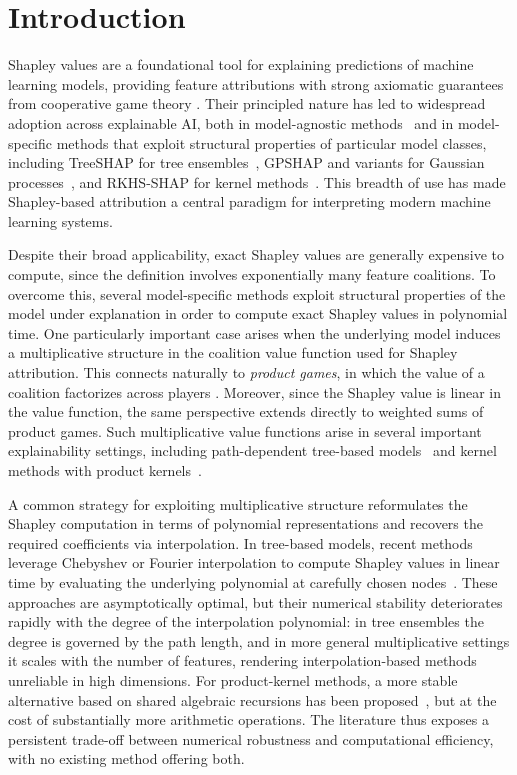 \documentclass{article}
\begin{document}
\section{Introduction}

Shapley values are a foundational tool for explaining predictions of machine learning models, providing feature attributions with strong axiomatic guarantees from cooperative game theory \citep{shapley}. Their principled nature has led to widespread adoption across explainable AI, both in model-agnostic methods~\citep{shap, shapiq, polyshap} and in model-specific methods that exploit structural properties of particular model classes, including TreeSHAP for tree ensembles~\citep{treeshap, linear_treeshap}, GPSHAP and variants for Gaussian processes~\citep{gpshap,fgpx_shapley}, and RKHS-SHAP for kernel methods~\citep{rkhs_shap}. This breadth of use has made Shapley-based attribution a central paradigm for interpreting modern machine learning systems.

Despite their broad applicability, exact Shapley values are generally expensive to compute, since the definition involves exponentially many feature coalitions. To overcome this, several model-specific methods exploit structural properties of the model under explanation in order to compute exact Shapley values in polynomial time. One particularly important case arises when the underlying model induces a multiplicative structure in the coalition value function used for Shapley attribution. This connects naturally to \emph{product games}, in which the value of a coalition factorizes across players \citep{cooperative_prodcut_games}. Moreover, since the Shapley value is linear in the value function, the same perspective extends directly to weighted sums of product games. Such multiplicative value functions arise in several important explainability settings, including path-dependent tree-based models~\citep{treeshap, linear_treeshap} and kernel methods with product kernels~\citep{pkex_shapley}.


A common strategy for exploiting multiplicative structure reformulates the Shapley computation in terms of polynomial representations and recovers the required coefficients via interpolation. In tree-based models, recent methods leverage Chebyshev or Fourier interpolation to compute Shapley values in linear time by evaluating the underlying polynomial at carefully chosen nodes~\citep{linear_treeshap, fourier_treeshap}. These approaches are asymptotically optimal, but their numerical stability deteriorates rapidly with the degree of the interpolation polynomial: in tree ensembles the degree is governed by the path length, and in more general multiplicative settings it scales with the number of features, rendering interpolation-based methods unreliable in high dimensions. For product-kernel methods, a more stable alternative based on shared algebraic recursions has been proposed~\citep{pkex_shapley}, but at the cost of substantially more arithmetic operations. The literature thus exposes a persistent trade-off between numerical robustness and computational efficiency, with no existing method offering both.
\end{document}
